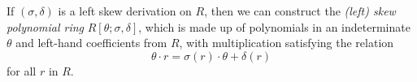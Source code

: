 \documentclass[12pt]{article}
\begin{document}
If $(\sigma, \delta)$ is a left skew derivation on $R$,
then we can construct the
{\it (left) skew polynomial ring}
$R[\theta;\sigma,\delta]$, which is made up of
polynomials in an indeterminate $\theta$
and left-hand coefficients from $R$,
with multiplication satisfying the relation
$$\theta \cdot r = \sigma(r) \cdot \theta + \delta(r)$$
for all $r$ in $R$.
\end{document}
